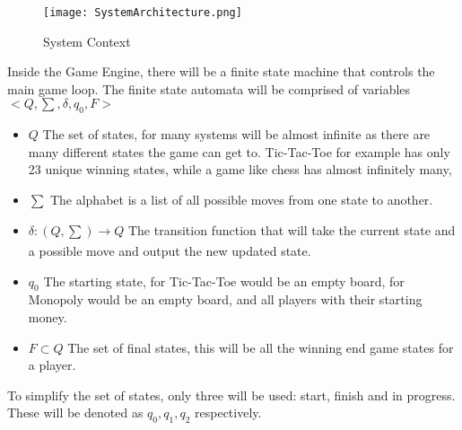 \documentclass[12pt]{article}
\begin{document}
\begin{figure}[h!]
\begin{center}
 \texttt{[image: SystemArchitecture.png]}
\caption{System Context}
\label{Fig_SystemContext} 
\end{center}
\end{figure}

Inside the Game Engine, there will be a finite state machine that controls the main game loop. The finite state automata will be comprised of variables $<Q, \sum, \delta, q_{0}, F>$
\begin{itemize}
    \item $Q$ The set of states, for many systems will be almost infinite as there are many different states the game can get to. Tic-Tac-Toe for example has only 23 unique winning states, while a game like chess has almost infinitely many,
    \item $\sum$ The alphabet is a list of all possible moves from one state to another.
    \item $\delta:(Q,\sum) \xrightarrow[]{} Q$ The transition function that will take the current state and a possible move and output the new updated state.
    \item $q_0$ The starting state, for Tic-Tac-Toe would be an empty board, for Monopoly would be an empty board, and all players with their starting money.
    \item $F \subset Q$ The set of final states, this will be all the winning end game states for a player.
\end{itemize}
To simplify the set of states, only three will be used: start, finish and in progress. These will be denoted as $q_0, q_1, q_2$ respectively. 
\end{document}
